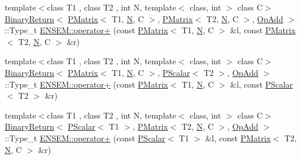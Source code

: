 \begin{DoxyCompactItemize}
{\footnotesize template$<$class T1 , class T2 , int N, template$<$ class, int $>$ class C$>$ }\\\mbox{\hyperlink{structENSEM_1_1BinaryReturn}{Binary\+Return}}$<$ \mbox{\hyperlink{classENSEM_1_1PMatrix}{P\+Matrix}}$<$ T1, \mbox{\hyperlink{adat__devel_2lib_2hadron_2operator__name__util_8cc_a7722c8ecbb62d99aee7ce68b1752f337}{N}}, C $>$, \mbox{\hyperlink{classENSEM_1_1PMatrix}{P\+Matrix}}$<$ T2, \mbox{\hyperlink{adat__devel_2lib_2hadron_2operator__name__util_8cc_a7722c8ecbb62d99aee7ce68b1752f337}{N}}, C $>$, \mbox{\hyperlink{structENSEM_1_1OpAdd}{Op\+Add}} $>$\+::Type\+\_\+t \mbox{\hyperlink{group__primmatrix_ga14b22344862e687608f50a8386764f6d}{E\+N\+S\+E\+M\+::operator+}} (const \mbox{\hyperlink{classENSEM_1_1PMatrix}{P\+Matrix}}$<$ T1, \mbox{\hyperlink{adat__devel_2lib_2hadron_2operator__name__util_8cc_a7722c8ecbb62d99aee7ce68b1752f337}{N}}, C $>$ \&l, const \mbox{\hyperlink{classENSEM_1_1PMatrix}{P\+Matrix}}$<$ T2, \mbox{\hyperlink{adat__devel_2lib_2hadron_2operator__name__util_8cc_a7722c8ecbb62d99aee7ce68b1752f337}{N}}, C $>$ \&r)
\item 
{\footnotesize template$<$class T1 , class T2 , int N, template$<$ class, int $>$ class C$>$ }\\\mbox{\hyperlink{structENSEM_1_1BinaryReturn}{Binary\+Return}}$<$ \mbox{\hyperlink{classENSEM_1_1PMatrix}{P\+Matrix}}$<$ T1, \mbox{\hyperlink{adat__devel_2lib_2hadron_2operator__name__util_8cc_a7722c8ecbb62d99aee7ce68b1752f337}{N}}, C $>$, \mbox{\hyperlink{classENSEM_1_1PScalar}{P\+Scalar}}$<$ T2 $>$, \mbox{\hyperlink{structENSEM_1_1OpAdd}{Op\+Add}} $>$\+::Type\+\_\+t \mbox{\hyperlink{group__primmatrix_gacd1e2ab4740e640c1aa2862faf4436db}{E\+N\+S\+E\+M\+::operator+}} (const \mbox{\hyperlink{classENSEM_1_1PMatrix}{P\+Matrix}}$<$ T1, \mbox{\hyperlink{adat__devel_2lib_2hadron_2operator__name__util_8cc_a7722c8ecbb62d99aee7ce68b1752f337}{N}}, C $>$ \&l, const \mbox{\hyperlink{classENSEM_1_1PScalar}{P\+Scalar}}$<$ T2 $>$ \&r)
\item 
{\footnotesize template$<$class T1 , class T2 , int N, template$<$ class, int $>$ class C$>$ }\\\mbox{\hyperlink{structENSEM_1_1BinaryReturn}{Binary\+Return}}$<$ \mbox{\hyperlink{classENSEM_1_1PScalar}{P\+Scalar}}$<$ T1 $>$, \mbox{\hyperlink{classENSEM_1_1PMatrix}{P\+Matrix}}$<$ T2, \mbox{\hyperlink{adat__devel_2lib_2hadron_2operator__name__util_8cc_a7722c8ecbb62d99aee7ce68b1752f337}{N}}, C $>$, \mbox{\hyperlink{structENSEM_1_1OpAdd}{Op\+Add}} $>$\+::Type\+\_\+t \mbox{\hyperlink{group__primmatrix_ga39561cdaedaf3bb4fb108575dae42de6}{E\+N\+S\+E\+M\+::operator+}} (const \mbox{\hyperlink{classENSEM_1_1PScalar}{P\+Scalar}}$<$ T1 $>$ \&l, const \mbox{\hyperlink{classENSEM_1_1PMatrix}{P\+Matrix}}$<$ T2, \mbox{\hyperlink{adat__devel_2lib_2hadron_2operator__name__util_8cc_a7722c8ecbb62d99aee7ce68b1752f337}{N}}, C $>$ \&r)

\end{DoxyCompactItemize}
